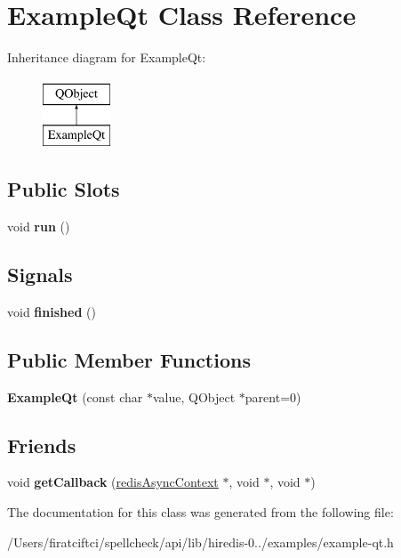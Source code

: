 \hypertarget{class_example_qt}{}\section{Example\+Qt Class Reference}
\label{class_example_qt}
Inheritance diagram for Example\+Qt\+:\begin{figure}[H]
\begin{center}
\leavevmode
\includegraphics[height=2.000000cm]{class_example_qt}
\end{center}
\end{figure}
\subsection*{Public Slots}
\begin{DoxyCompactItemize}
\item 
\mbox{\label{class_example_qt_aa8177d7936135b05c848999600c95e0e}} 
void {\bfseries run} ()
\end{DoxyCompactItemize}
\subsection*{Signals}
\begin{DoxyCompactItemize}
\item 
\mbox{\label{class_example_qt_a7d911d1ef947a8ae419cb64f913131a3}} 
void {\bfseries finished} ()
\end{DoxyCompactItemize}
\subsection*{Public Member Functions}
\begin{DoxyCompactItemize}
\item 
\mbox{\label{class_example_qt_af45f6ecf229fb42080b290433f1dbdbc}} 
{\bfseries Example\+Qt} (const char $\ast$value, Q\+Object $\ast$parent=0)
\end{DoxyCompactItemize}
\subsection*{Friends}
\begin{DoxyCompactItemize}
\item 
\mbox{\label{class_example_qt_a03db4ff40c3001d8f35b6cbc5073a324}} 
void {\bfseries get\+Callback} (\mbox{\hyperlink{structredis_async_context}{redis\+Async\+Context}} $\ast$, void $\ast$, void $\ast$)
\end{DoxyCompactItemize}


The documentation for this class was generated from the following file\+:\begin{DoxyCompactItemize}
\item 
/\+Users/firatciftci/spellcheck/api/lib/hiredis-\/0../examples/example-\/qt.\+h\end{DoxyCompactItemize}
